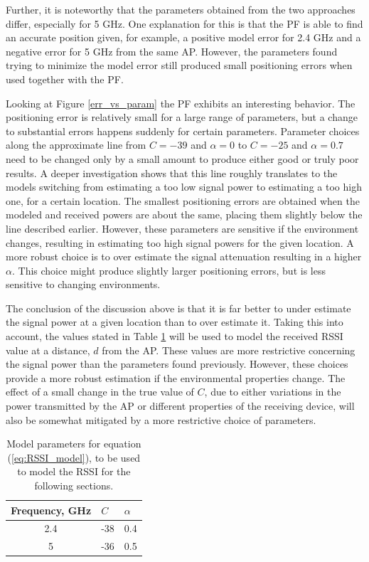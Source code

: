 \documentclass{LTHthesis}
\begin{document}
Further, it is noteworthy that the parameters obtained from the two approaches differ, especially for 5 GHz. One explanation for this is that the PF is able to find an accurate position given, for example, a positive model error for 2.4 GHz and a negative error for 5 GHz from the same AP. However, the parameters found trying to minimize the model error still produced small positioning errors when used together with the PF. 

Looking at Figure \ref{err_vs_param} the PF exhibits an interesting behavior. The positioning error is relatively small for a large range of parameters, but a change to substantial errors happens suddenly for certain parameters. Parameter choices along the approximate line from  $C=-39$ and $\alpha=0$ to $C=-25$ and $\alpha=0.7$ need to be changed only by a small amount to produce either good or truly poor results. A deeper investigation shows that this line roughly translates to the models switching from estimating a too low signal power to estimating a too high one, for a certain location. The smallest positioning errors are obtained when the modeled and received powers are about the same, placing them slightly below the line described earlier. However, these parameters are sensitive if the environment changes, resulting in estimating too high signal powers for the given location. A more robust choice is to over estimate the signal attenuation resulting in a higher $\alpha$. This choice might produce slightly larger positioning errors, but is less sensitive to changing environments.

The conclusion of the discussion above is that it is far better to under estimate the signal power at a given location than to over estimate it. Taking this into account, the values stated in Table \ref{table:model_par} will be used to model the received RSSI value at a distance, $d$ from the AP.  These values are more restrictive concerning the signal power than the parameters found previously. However, these choices provide a more robust estimation if the environmental properties change. The effect  of a small change in the true value of $C$, due to either variations in the power transmitted by the AP or different properties of the receiving device, will also be somewhat mitigated by a more restrictive choice of parameters.  
%
\begin{table}[!hbt]
\begin{center}
\begin{tabular}{|c|l|l|}
\hline
Frequency, GHz & $C$ & $\alpha$ \\
\hline
2.4 & -38 & 0.4 \\
\hline
5 & -36 & 0.5 \\
\hline
\end{tabular}
\end{center}
\caption{Model parameters for equation (\ref{eq:RSSI_model}), to be used to model the RSSI for the following sections.}\label{table:model_par}
\end{table}
  
\end{document}
